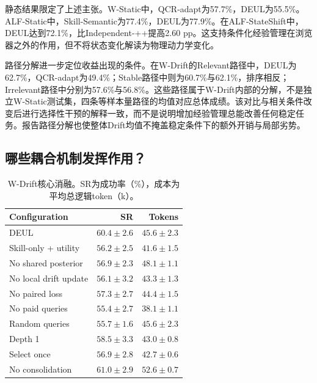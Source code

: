 \documentclass[sigconf,anonymous,review]{acmart}
\theoremstyle{zhplain}
\begin{document}
静态结果限定了上述主张。W-Static中，QCR-adapt为57.7\%，DEUL为55.5\%。ALF-Static中，Skill-Semantic为77.4\%，DEUL为77.9\%。在ALF-StateShift中，DEUL达到72.1\%，比Independent-++提高2.60 pp。这支持条件化经验管理在浏览器之外的作用，但不将状态变化解读为物理动力学变化。

路径分解进一步定位收益出现的条件。在W-Drift的Relevant路径中，DEUL为62.7\%，QCR-adapt为49.4\%；Stable路径中则为60.7\%与62.1\%，排序相反；Irrelevant路径中分别为57.6\%与56.8\%。这些路径属于W-Drift内部的分解，不是独立W-Static测试集，四条等样本量路径的均值对应总体成绩。该对比与相关条件改变后进行选择性干预的解释一致，而不是说明增加经验管理总能改善任何稳定任务。报告路径分解也使整体Drift均值不掩盖稳定条件下的额外开销与局部劣势。

\subsection{哪些耦合机制发挥作用？}

\begin{table}[t]
\centering
\caption{W-Drift核心消融。SR为成功率（\%），成本为平均总逻辑token（k）。}
\label{tab:ablation}
\small
\begin{tabular}{@{}lrr@{}}
\toprule
Configuration & SR & Tokens \\
\midrule
DEUL & \(60.4\!\pm\!2.6\) & \(45.6\!\pm\!2.3\) \\
Skill-only + utility & \(56.2\!\pm\!2.5\) & \(41.6\!\pm\!1.5\) \\
No shared posterior & \(56.9\!\pm\!2.3\) & \(48.1\!\pm\!1.1\) \\
No local drift update & \(56.1\!\pm\!3.2\) & \(43.3\!\pm\!1.3\) \\
No paired loss & \(57.3\!\pm\!2.7\) & \(44.4\!\pm\!1.5\) \\
No paid queries & \(55.4\!\pm\!2.7\) & \(38.1\!\pm\!1.1\) \\
Random queries & \(55.7\!\pm\!1.6\) & \(45.6\!\pm\!2.3\) \\
Depth 1 & \(58.5\!\pm\!3.3\) & \(43.0\!\pm\!0.8\) \\
Select once & \(56.9\!\pm\!2.8\) & \(42.7\!\pm\!0.6\) \\
No consolidation & \(61.0\!\pm\!2.9\) & \(52.6\!\pm\!0.7\) \\
\bottomrule
\end{tabular}
\end{table}

\end{document}
